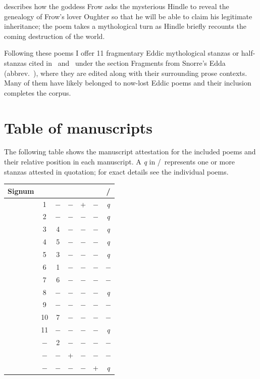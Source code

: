  describes how the goddess Frow asks the mysterious Hindle to reveal the genealogy of Frow’s lover Oughter so that he will be able to claim his legitimate inheritance; the poem takes a mythological turn as Hindle briefly recounts the coming destruction of the world.

Following these poems I offer 11 fragmentary Eddic mythological stanzas or half-stanzas cited in \Gylfaginning\ and \Skaldskaparmal\ under the section Fragments from Snorre’s Edda (abbrev.~), where they are edited along with their surrounding prose contexts.  Many of them have likely belonged to now-lost Eddic poems and their inclusion completes the corpus.

\section{Table of manuscripts}

The following table shows the manuscript attestation for the included poems and their relative position in each manuscript.  A \emph{q} in \Gylfaginning/\Skaldskaparmal\ represents one or more stanzas attested in quotation; for exact details see the individual poems.

\begin{small}\begin{longtabu} to \textwidth {|l c c c c c c|}
	\hline
	Signum & \Regius & \AM & \Wormianus & \Hauksbok & \FlatMS & \Gylfaginning/\Skaldskaparmal \\ [0.5ex]
	\hline\hline\endhead
	\hline\endfoot
          & 1  & − & − & + & − & \emph{q} \\
          & 2  & − & − & − & − & \emph{q} \\
   & 3  & 4 & − & − & − & \emph{q} \\
       & 4  & 5 & − & − & − & \emph{q} \\
       & 5  & 3 & − & − & − & \emph{q} \\
     & 6  & 1 & − & − & − & − \\
       & 7  & 6 & − & − & − & − \\
        & 8  & − & − & − & − & \emph{q} \\
      & 9  & − & − & − & − & − \\
    & 10 & 7 & − & − & − & − \\
        & 11 & − & − & − & − & \emph{q} \\
    & −  & 2 & − & − & − & − \\
        & −  & − & + & − & − & − \\
       & −  & − & − & − & + & \emph{q} \\ [1ex]
  \hline
\end{longtabu}\end{small}
